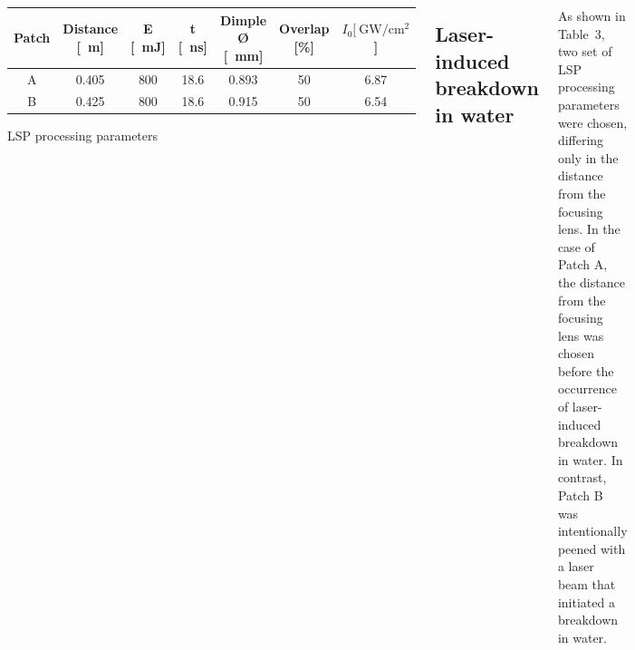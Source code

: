 \documentclass[20pt,margin=1in,innermargin=-4.5in,blockverticalspace=-0.25in]{tikzposter}
\begin{document}
\begin{columns}
{\begin{center}
    \begin{threeparttable}
        \centering
        \begin{tabular}{|c|c | c| c| c| c| c|} 
        \hline
           \textbf{Patch} & \textbf{Distance [\SI{}{\m}]} & \textbf{E [\SI{}{\milli\joule}]} & \textbf{t [\SI{}{\ns}]} & \textbf{Dimple Ø [\SI{}{ \mm}]}  & \textbf{Overlap [\%] } & \textbf{\( I_0  [\SI[]{}{\giga\watt/\cm^2} \)] }\\ [0.5ex] 
  
        \hline
         A & 0.405 &  800   & 18.6 & 0.893 & 50 & 6.87  \\

        \hline
         B & 0.425 &  800   & 18.6 & 0.915 & 50 & 6.54  \\

        \hline
        \end{tabular}

        \caption[Litron~LPY~ST~7875-10~2HG parameters]{LSP processing parameters}
        
       
    \end{threeparttable}

    \label{tab:xrdparameters}
    \end{center}

    
    \subsection*{Laser-induced breakdown in water}
    As shown in Table~3, two set of LSP processing parameters were chosen, differing only in the distance from the focusing lens. In the case of Patch A, the distance from the focusing lens was chosen before the occurrence of laser-induced breakdown in water. In contrast, Patch B was intentionally peened with a laser beam that initiated a breakdown in water.  


    }

\end{columns}
\end{document}
